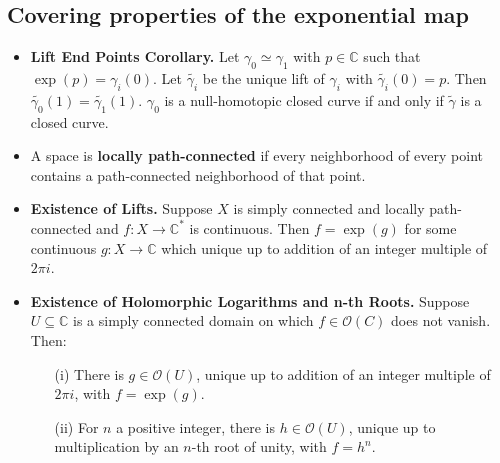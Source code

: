\documentclass{article}
\newenvironment{topic}[1]{%
{\subsection{#1}}%
\begin{itemize}%
}{%
\end{itemize}%
}
\newcommand{\theorem}[1]{\item {\bf #1.}}
\newcommand{\corollary}[1]{\item {\bf #1.}}
\newcommand{\term}[1]{{\bf #1}}
\newcommand{\holo}[1]{\mathcal{O}(#1)}
\newcommand{\remark}{\item}
\begin{document}
\begin{topic}{Covering properties of the exponential map}
\corollary{Lift End Points Corollary} Let $\gamma_0 \simeq \gamma_1$ with $p \in \mathbb{C}$ such that $\exp(p) = \gamma_i(0)$. Let $\tilde{\gamma_i}$ be the unique lift of $\gamma_i$ with $\tilde{\gamma_i}(0) = p$. Then $\tilde{\gamma_0}(1) = \tilde{\gamma_1}(1)$. $\gamma_0$ is a null-homotopic closed curve if and only if $\tilde{\gamma}$ is a closed curve.

\remark A space is \term{locally path-connected} if every neighborhood of every point contains a path-connected neighborhood of that point.

\theorem{Existence of Lifts} Suppose $X$ is simply connected and locally path-connected and $f : X \to \mathbb{C}^\ast$ is continuous. Then $f = \exp(g)$ for some continuous $g : X \to \mathbb{C}$ which unique up to addition of an integer multiple of $2 \pi i$.

\corollary{Existence of Holomorphic Logarithms and n-th Roots} Suppose $U \subseteq \mathbb{C}$ is a simply connected domain on which $f \in \holo{C}$ does not vanish. Then:
\begin{enumerate}
\item[(i)] There is $g \in \holo{U}$, unique up to addition of an integer multiple of $2 \pi i$, with $f = \exp(g)$.
\item[(ii)] For $n$ a positive integer, there is $h \in \holo{U}$, unique up to multiplication by an $n$-th root of unity, with $f = h^n$.
\end{enumerate}

\end{topic}
\end{document}
